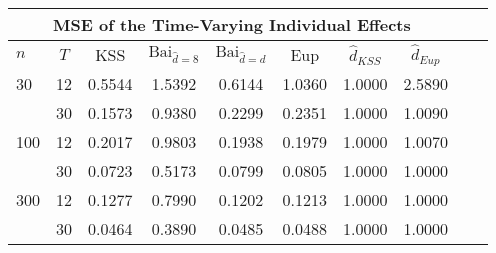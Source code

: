 \begin{tabular}{lccccccccc} 
\hline \multicolumn{8}{c}{MSE of the Time-Varying Individual Effects} \\ \hline 
$n$ & $T$ & KSS & $ \text{Bai}_{\hat{d} = 8}$ & $\text{Bai}_{\hat{d} = d}$ & Eup & $\hat{d}_{KSS}$ & $\hat{d}_{Eup}$ \\
\hline
30 & 12 &  0.5544  &  1.5392  &  0.6144  &  1.0360  &  1.0000  &  2.5890  \\
& 30 &  0.1573  &  0.9380  &  0.2299  &  0.2351  &  1.0000  &  1.0090  \\
100 & 12 &  0.2017  &  0.9803  &  0.1938  &  0.1979  &  1.0000  &  1.0070  \\
& 30 &  0.0723  &  0.5173  &  0.0799  &  0.0805  &  1.0000  &  1.0000  \\
300 & 12 &  0.1277  &  0.7990  &  0.1202  &  0.1213  &  1.0000  &  1.0000  \\
& 30 &  0.0464  &  0.3890  &  0.0485  &  0.0488  &  1.0000  &  1.0000  \\
\end{tabular} 
